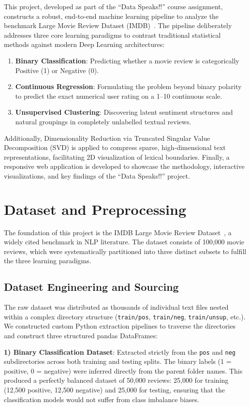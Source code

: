 \documentclass[conference]{IEEEtran}
\begin{document}
This project, developed as part of the ``Data Speaks!!'' course assignment, constructs a robust, end-to-end machine learning pipeline to analyze the benchmark Large Movie Review Dataset (IMDB)~\cite{b2}. The pipeline deliberately addresses three core learning paradigms to contrast traditional statistical methods against modern Deep Learning architectures:

\begin{enumerate}
    \item \textbf{Binary Classification}: Predicting whether a movie review is categorically Positive (1) or Negative (0).
    \item \textbf{Continuous Regression}: Formulating the problem beyond binary polarity to predict the exact numerical user rating on a 1--10 continuous scale.
    \item \textbf{Unsupervised Clustering}: Discovering latent sentiment structures and natural groupings in completely unlabelled textual reviews.
\end{enumerate}

Additionally, Dimensionality Reduction via Truncated Singular Value Decomposition (SVD) is applied to compress sparse, high-dimensional text representations, facilitating 2D visualization of lexical boundaries. Finally, a responsive web application is developed to showcase the methodology, interactive visualizations, and key findings of the ``Data Speaks!!'' project.

\section{Dataset and Preprocessing}
The foundation of this project is the IMDB Large Movie Review Dataset~\cite{b2}, a widely cited benchmark in NLP literature. The dataset consists of 100,000 movie reviews, which were systematically partitioned into three distinct subsets to fulfill the three learning paradigms.

\subsection{Dataset Engineering and Sourcing}
The raw dataset was distributed as thousands of individual text files nested within a complex directory structure (\texttt{train/pos}, \texttt{train/neg}, \texttt{train/unsup}, etc.). We constructed custom Python extraction pipelines to traverse the directories and construct three structured pandas DataFrames:

\textbf{1) Binary Classification Dataset}: 
Extracted strictly from the \texttt{pos} and \texttt{neg} subdirectories across both training and testing splits. The binary labels (1 = positive, 0 = negative) were inferred directly from the parent folder names. This produced a perfectly balanced dataset of 50,000 reviews: 25,000 for training (12,500 positive, 12,500 negative) and 25,000 for testing, ensuring that the classification models would not suffer from class imbalance biases.
\end{document}
